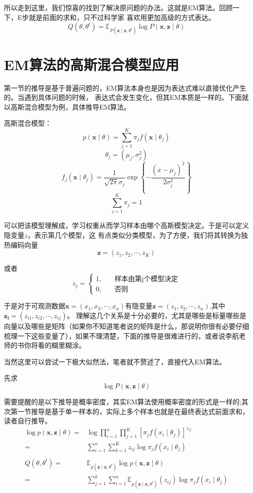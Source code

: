 \documentclass{article}
\begin{document}
        所以走到这里，我们惊喜的找到了解决原问题的办法。这就是EM算法。回顾一下，E步就是前面的求和，只不过科学家
        喜欢用更加高级的方式表达。
        \[Q(\theta,\theta^t)=\mathbb{E}_{P(\boldsymbol{z}\mid\boldsymbol{x},\theta^t)}\log P(\boldsymbol{x},\boldsymbol{z}\mid \theta)\]

    \section{EM算法的高斯混合模型应用}
        第一节的推导是基于普遍问题的，EM算法本身也是因为表达式难以直接优化产生的。当遇到具体问题的时候，
        表达式会发生变化，但其EM本质是一样的。下面就以高斯混合模型为例，具体推导EM算法。

        高斯混合模型：
        \[p(\boldsymbol{x}\mid \theta)=\sum_{j=1}^{K}\pi_jf(\boldsymbol{x}\mid\theta_j)\]
        \[\theta_j=(\mu_j,\sigma_j^2  )\]
        \[f_j(\boldsymbol{x}\mid\theta_j)=\frac{1}{\sqrt{2\pi}\sigma_j}\exp\left\{-\frac{(x-\mu_j)^2}{2\sigma_j^2}\right\}\]
        \[\sum_{j=1}^{K}\pi_j=1\]

        可以把该模型理解成，学习权重从而学习样本由哪个高斯模型决定。于是可以定义隐变量$z$，表示第几个模型，这
        有点类似分类模型，为了方便，我们将其转换为独热编码向量
        \[\boldsymbol{z}=(z_1,z_2,\cdots,z_K)\]

        或者
        \[z_j=
        \begin{cases}
            1,&\quad \text{样本由第j个模型决定}\\
            0,&\quad \text{否则}
        \end{cases}
        \]

        于是对于可观测数据$\boldsymbol{x}=(x_1,x_2,\cdots,x_n)$有隐变量$\boldsymbol{z}=(z_1,z_2,\cdots,z_n)$,其中$\boldsymbol{z_i}=(z_{i1},z_{i2},\cdots,z_{ij})$。
        理解这几个关系是十分必要的，尤其是哪些是标量哪些是向量以及哪些是矩阵（如果你不知道笔者说的矩阵是什么，那说明你很有必要仔细梳理一下这些变量了），如果不理清楚，下面的推导是很难进行的，或者说李航老师的书你将看的糊里糊涂。

        当然这里可以尝试一下极大似然法，笔者就不赘述了，直接代入EM算法。
        
        先求
        \[\log P(\boldsymbol{x},\boldsymbol{z}\mid\theta)\]

        需要提醒的是以下推导是概率密度，其实EM算法使用概率密度的形式是一样的;其次第一节推导是基于单一样本的，实际上多个样本也就是在最终表达式前面求和，读者自行推导。
        \begin{align*}
            \log p(\boldsymbol{x},\boldsymbol{z}\mid \theta)=&\log\prod_{i=1}^{n}\prod_{j=1}^{K}\left[\pi_jf(x_i\mid\theta_j)\right]^{z_{ij}}\\
                =&\sum_{i=1}^{n}\sum_{k=1}^{K}z_{ij}\log\pi_jf(x_i\mid\theta_j)\\
                \\
                Q(\theta,\theta^t)=&\mathbb{E}_{p(\boldsymbol{z}\mid\boldsymbol{x},\theta^t)}\log p(\boldsymbol{x},\boldsymbol{z}\mid \theta)\\
                =&\sum_{j=1}^{k}\sum_{i=1}^{n}\mathbb{E}_{p(\boldsymbol{z}\mid\boldsymbol{x},\theta^t)}(z_{ij})\log\pi_jf(x_i\mid\theta_j)
        \end{align*}
\end{document}
